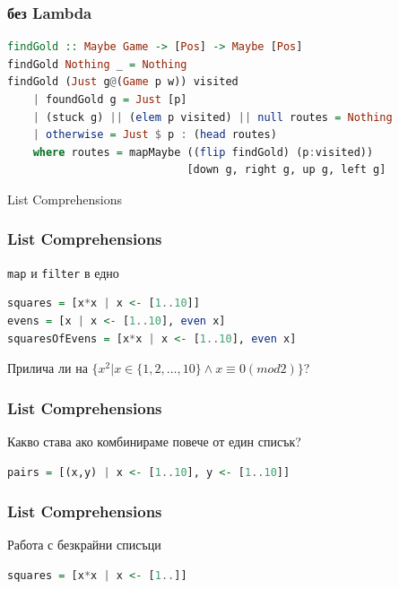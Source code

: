 \documentclass{beamer}
\begin{document}
\begin{frame}[fragile]
  \frametitle{без Lambda}

\begin{lstlisting}[basicstyle=\tiny,language=Haskell]
findGold :: Maybe Game -> [Pos] -> Maybe [Pos]
findGold Nothing _ = Nothing
findGold (Just g@(Game p w)) visited
    | foundGold g = Just [p]
    | (stuck g) || (elem p visited) || null routes = Nothing
    | otherwise = Just $ p : (head routes)
    where routes = mapMaybe ((flip findGold) (p:visited))
                            [down g, right g, up g, left g]  
\end{lstlisting}
  
\end{frame}

\begin{frame}
  \centerline{List Comprehensions}
\end{frame}

\begin{frame}[fragile]
  \frametitle{List Comprehensions}

\verb#map# и \verb#filter# в едно

\bigskip

\begin{lstlisting}[basicstyle=\small,language=Haskell]
squares = [x*x | x <- [1..10]]
evens = [x | x <- [1..10], even x]
squaresOfEvens = [x*x | x <- [1..10], even x]
\end{lstlisting}
  
\bigskip

Прилича ли на $\{x^2 | x \in \{1,2,\dots,10\} \land x \equiv 0 (mod 2)\}$?
\end{frame}


\begin{frame}[fragile]
  \frametitle{List Comprehensions}

Какво става ако комбинираме повече от един списък?

\bigskip

\begin{lstlisting}[basicstyle=\small,language=Haskell]
pairs = [(x,y) | x <- [1..10], y <- [1..10]]
\end{lstlisting}
  
\end{frame}

\begin{frame}[fragile]
  \frametitle{List Comprehensions}

Работа с безкрайни списъци

\bigskip

\begin{lstlisting}[basicstyle=\small,language=Haskell]
squares = [x*x | x <- [1..]]
\end{lstlisting}
  
\end{frame}
\end{document}
